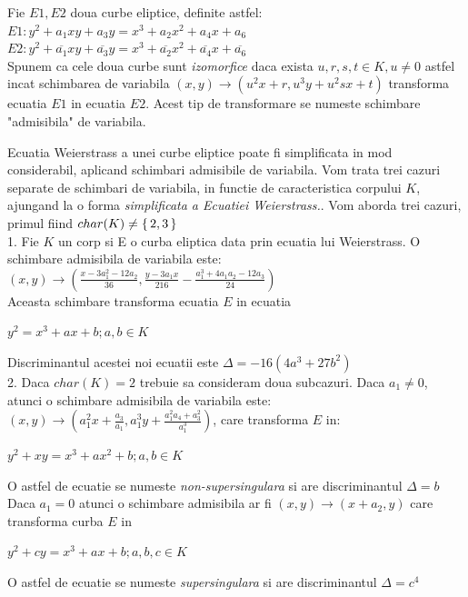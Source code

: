 \begin{dfn}
Fie $E1, E2$ doua curbe eliptice, definite astfel: \\
$E1 : y^2 + a_1xy + a_3y = x^3 + a_2x^{2} + a_4x + a_6$ \\
$E2 : y^2 + \overline{a_1}xy + \overline{a_3}y = x^3 + \overline{a_2}x^{2} + \overline{a_4}x + \overline{a_6} $ \\
Spunem ca cele doua curbe sunt \textit{izomorfice} daca exista $u,r,s,t\in K, u\neq 0$ astfel incat schimbarea de variabila $(x, y)\rightarrow (u^2x + r, u^3y + u^2sx + t)$ transforma ecuatia $E1$ in ecuatia $E2$. Acest tip de transformare se numeste schimbare "admisibila" de variabila.
\end{dfn}
\begin{dfn}
Ecuatia Weierstrass a unei curbe eliptice poate fi simplificata in mod considerabil, aplicand schimbari admisibile de variabila. Vom trata trei cazuri separate de schimbari de variabila, in functie de caracteristica corpului $K$, ajungand la o forma \textit{simplificata a Ecuatiei Weierstrass.}. Vom aborda trei cazuri, primul fiind $char(K) \neq \set {2,3}$ \\

  1. Fie $K$ un corp si E o curba eliptica data prin ecuatia lui Weierstrass. O schimbare admisibila de variabila este:
$(x, y) \rightarrow (\frac{x - 3a_1^{2} - 12a_2}{36}, \frac{y-3a_1x}{216} - \frac{a_1^{3} + 4a_1a_2 - 12a_3}{24})$ \\
Aceasta schimbare transforma ecuatia $E$ in ecuatia 
\begin{center} $y^2 = x^3 + ax + b; a, b\in K$\end{center}
Discriminantul acestei noi ecuatii este $\Delta = -16(4a^3 + 27b^2)$ \\

2. Daca $char(K) = 2$ trebuie sa consideram doua subcazuri. Daca $a_1 \neq 0$, atunci o schimbare admisibila de variabila este: $(x, y) \rightarrow (a_1^2x + \frac{a_3}{a_1}, a_1^3y + \frac{a_1^2a_4 + a_3^2}{a_1^3} )$, care transforma $E$ in:
\begin{center}$y^2 + xy = x^3 + ax^2 + b; a, b\in K$\end{center}
O astfel de ecuatie se numeste \textit{non-supersingulara} si are discriminantul $\Delta = b$ \\
Daca $a_1 = 0$ atunci o schimbare admisibila ar fi $(x, y)\rightarrow (x + a_2, y)$ care transforma curba $E$ in
\begin{center} $y^2 + cy = x^3 + ax + b; a,b,c\in K$ \end{center}
O astfel de ecuatie se numeste \textit{supersingulara} si are discriminantul $\Delta = c^4$
\\


\end{dfn}
